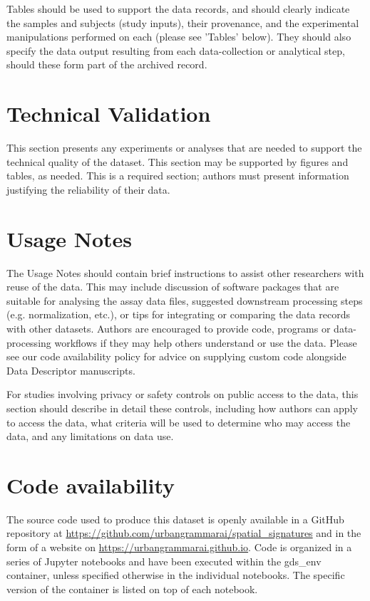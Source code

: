 \documentclass[fleqn,10pt]{wlscirep}
\begin{document}
Tables should be used to support the data records, and should clearly indicate the
samples and subjects (study inputs), their provenance, and the experimental
manipulations performed on each (please see 'Tables' below). They should also specify
the data output resulting from each data-collection or analytical step, should these
form part of the archived record.



\section*{Technical Validation}

This section presents any experiments or analyses that are needed to support the
technical quality of the dataset. This section may be supported by figures and tables,
as needed. This is a required section; authors must present information justifying the
reliability of their data.




\section*{Usage Notes}

The Usage Notes should contain brief instructions to assist other researchers with reuse
of the data. This may include discussion of software packages that are suitable for
analysing the assay data files, suggested downstream processing steps (e.g.
normalization, etc.), or tips for integrating or comparing the data records with other
datasets. Authors are encouraged to provide code, programs or data-processing workflows
if they may help others understand or use the data. Please see our code availability
policy for advice on supplying custom code alongside Data Descriptor manuscripts.

For studies involving privacy or safety controls on public access to the data, this
section should describe in detail these controls, including how authors can apply to
access the data, what criteria will be used to determine who may access the data, and
any limitations on data use.



\section*{Code availability}

The source code used to produce this dataset is openly available in a GitHub repository
at
\hyperlink{https://github.com/urbangrammarai/spatial_signatures}{https://github.com/urbangrammarai/spatial_signatures}
and in the form of a website on
\hyperlink{https://urbangrammarai.github.io}{https://urbangrammarai.github.io}. Code is
organized in a series of Jupyter notebooks and have been executed within the gds_env
container, unless specified otherwise in the individual notebooks. The specific version
of the container is listed on top of each notebook.
\end{document}
